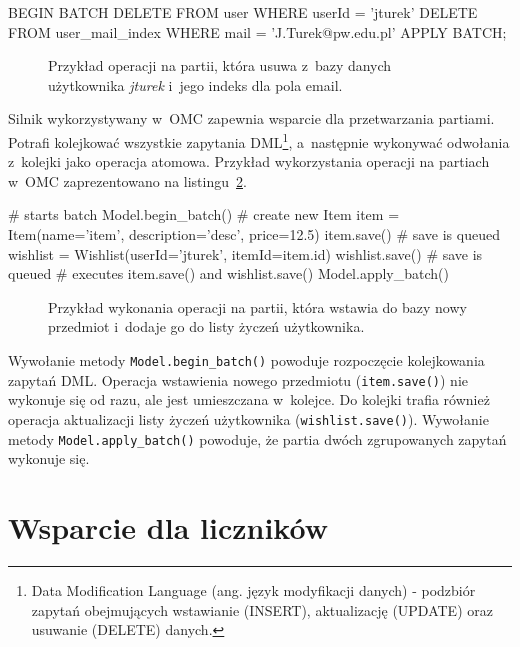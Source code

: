 \begin{verbbox}[\footnotesize]
	BEGIN BATCH
	  DELETE FROM user WHERE userId = 'jturek'
	  DELETE FROM user_mail_index WHERE mail = 'J.Turek@pw.edu.pl'
	APPLY BATCH;
\end{verbbox}

\begin{figure}[ht!]
	\centering
	\theverbbox
	\caption{Przykład operacji na partii, która usuwa z~bazy danych użytkownika \emph{jturek} i~jego indeks dla pola email.}
	\label{lst:batch_operation_cql_example}
\end{figure}

Silnik wykorzystywany w~OMC zapewnia wsparcie dla przetwarzania partiami. Potrafi kolejkować wszystkie zapytania DML\footnote{Data Modification Language (ang. język modyfikacji danych) - podzbiór zapytań obejmujących wstawianie (INSERT), aktualizację (UPDATE) oraz usuwanie (DELETE) danych.}, a~następnie wykonywać odwołania z~kolejki jako operacja atomowa. Przykład wykorzystania operacji na partiach w~OMC zaprezentowano na listingu~\ref{lst:ocm_batch_support}.

\begin{verbbox}[\footnotesize]
	# starts batch
	Model.begin_batch()
	# create new Item
	item = Item(name='item', description='desc', price=12.5)
	item.save()    # save is queued
	wishlist = Wishlist(userId='jturek', itemId=item.id)
	wishlist.save()    # save is queued
	# executes item.save() and wishlist.save()
	Model.apply_batch()
\end{verbbox}

\begin{figure}[ht!]
	\centering
	\theverbbox
	\caption{Przykład wykonania operacji na partii, która wstawia do bazy nowy przedmiot i~dodaje go do listy życzeń użytkownika.}
	\label{lst:ocm_batch_support}
\end{figure}

Wywołanie metody \verb+Model.begin_batch()+ powoduje rozpoczęcie kolejkowania zapytań DML. Operacja wstawienia nowego przedmiotu (\verb+item.save()+) nie wykonuje się od razu, ale jest umieszczana w~kolejce. Do kolejki trafia również operacja aktualizacji listy życzeń użytkownika (\verb+wishlist.save()+). Wywołanie metody \verb+Model.apply_batch()+ powoduje, że partia dwóch zgrupowanych zapytań wykonuje się.

\section{Wsparcie dla liczników}
\label{sec:ocm_counters}

